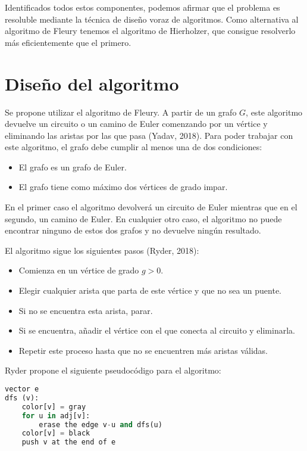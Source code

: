 Identificados todos estos componentes, podemos afirmar que el problema es resoluble mediante la técnica de diseño voraz de algoritmos.
Como alternativa al algoritmo de Fleury tenemos el algoritmo de Hierholzer, que consigue resolverlo más eficientemente que el primero.

\section{Diseño del algoritmo}\label{voraces-disenio}

Se propone utilizar el algoritmo de Fleury.
A partir de un grafo $G$, este algoritmo devuelve un circuito o un camino de Euler comenzando por un vértice y eliminando las aristas por las que pasa (Yadav, 2018).
Para poder trabajar con este algoritmo, el grafo debe cumplir al menos una de dos condiciones:

\begin{itemize}
	\item El grafo es un grafo de Euler.
	\item El grafo tiene como máximo dos vértices de grado impar.
\end{itemize}

En el primer caso el algoritmo devolverá un circuito de Euler mientras que en el segundo, un camino de Euler.
En cualquier otro caso, el algoritmo no puede encontrar ninguno de estos dos grafos y no devuelve ningún resultado.

El algoritmo sigue los siguientes pasos (Ryder, 2018):

\begin{itemize}
	\item Comienza en un vértice de grado $g>0$.
	\item Elegir cualquier arista que parta de este vértice y que no sea un puente.
	\item Si no se encuentra esta arista, parar.
	\item Si se encuentra, añadir el vértice con el que conecta al circuito y eliminarla.
	\item Repetir este proceso hasta que no se encuentren más aristas válidas.
\end{itemize}

Ryder propone el siguiente pseudocódigo para el algoritmo:

\begin{lstlisting}[language=Python]
vector e
dfs (v):
	color[v] = gray
	for u in adj[v]:
		erase the edge v-u and dfs(u)
	color[v] = black
	push v at the end of e
\end{lstlisting}

